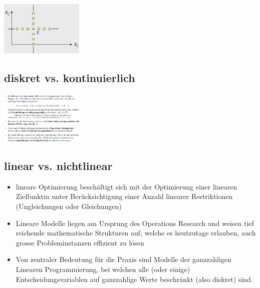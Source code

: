\documentclass{report}
\newenvironment{Figure}
	{\par\medskip\noindent\minipage{\linewidth}}
	{\endminipage\par\medskip}
\theoremstyle{definition}
\theoremstyle{example}
\begin{document}
\begin{Figure}
\centering
\includegraphics[width=150px]{img/KombNachbarschaft.png}
	\label{fig:Beispiel einer kombinatorische Nachbarschaft für R2}
\end{Figure}

   \subsection{diskret vs. kontinuierlich}
\begin{Figure}
\centering
\includegraphics[width=150px]{img/DiskKont.png}
	\label{fig:diskret vs kontinuierlich}
\end{Figure}

   \subsection{linear vs. nichtlinear}
\begin{itemize}
   \item lineare Optimierung beschäftigt sich mit der Optimierung einer linearen Zielfunktin unter Berücksichtigung einer Anzahl linearer Restriktionen (Ungleichungen oder Gleichungen)
   \item Lineare Modelle liegen am Ursprung des Operations Research und weisen tief reichende mathematische Strukturen auf, welche es heutzutage erlauben, auch grosse Probleminstanzen effizient zu lösen
   \item Von zentraler Bedeutung für die Praxis sind Modelle der ganzzahligen Linearen Programmierung, bei welchen alle (oder einige) Entscheidungsvariablen auf ganzzahlige Werte beschränkt (also diskret) sind. 
\end{itemize}
\end{document}
